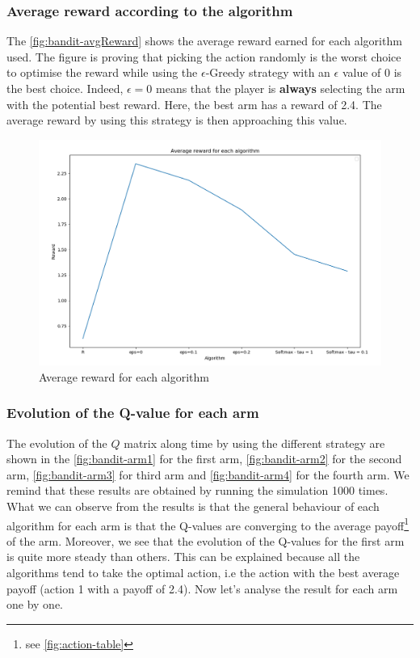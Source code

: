 \documentclass{article}
\begin{document}
\subsubsection{Average reward according to the algorithm}

The \autoref{fig:bandit-avgReward} shows the average reward earned for each algorithm used. The figure is proving that picking the action randomly is the worst choice to optimise the reward while using the $\epsilon$-Greedy strategy with an $\epsilon$ value of 0 is the best choice. Indeed, $\epsilon = 0$ means that the player is \textbf{always} selecting the arm with the potential best reward. Here, the best arm has a reward of 2.4. The average reward by using this strategy is then approaching this value. 

\begin{figure}[H]
  \centering
  \includegraphics[scale=0.32]{fig/bandit-avgReward.png}
  \caption{Average reward for each algorithm}
  \label{fig:bandit-avgReward}
\end{figure}

\subsubsection{Evolution of the Q-value for each arm}

The evolution of the $Q$ matrix along time by using the different strategy are shown in the \autoref{fig:bandit-arm1} for the first arm, \autoref{fig:bandit-arm2} for the second arm, \autoref{fig:bandit-arm3} for third arm and \autoref{fig:bandit-arm4} for the fourth arm. We remind that these results are obtained by running the simulation 1000 times. What we can observe from the results is that the general behaviour of each algorithm for each arm is that the Q-values are converging to the average payoff\footnote{see \autoref{fig:action-table}} of the arm. Moreover, we see that the evolution of the Q-values for the first arm is quite more steady than others. This can be explained because all the algorithms tend to take the optimal action, i.e the action with the best average payoff (action 1 with a payoff of 2.4). Now let's analyse the result for each arm one by one.  \\
\end{document}
